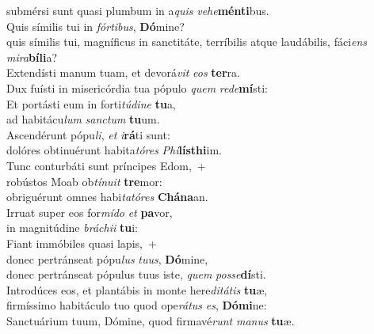 \oddverse submérsi sunt quasi plumbum in a\textit{quis} \textit{ve}\textit{he}\textbf{mén}\textbf{ti}bus.\\
\evenverse Quis símilis tui in \textit{fór}\textit{ti}\textit{bus}, \textbf{Dó}mine?~\*\\
\evenverse quis símilis tui, magníficus in sanctitáte, terríbilis atque laudábilis, fáci\textit{ens} \textit{mi}\textit{ra}\textbf{bí}\textbf{li}a?\\
\oddverse Extendísti manum tuam, et devorá\textit{vit} \textit{e}\textit{os} \textbf{ter}ra.~\*\\
\oddverse Dux fuísti in misericórdia tua pópulo \textit{quem} \textit{re}\textit{de}\textbf{mí}sti:\\
\evenverse Et portásti eum in forti\textit{tú}\textit{di}\textit{ne} \textbf{tu}a,~\*\\
\evenverse ad habitácu\textit{lum} \textit{san}\textit{ctum} \textbf{tu}um.\\
\oddverse Ascendérunt pópu\textit{li}, \textit{et} \textit{i}\textbf{rá}ti sunt:~\*\\
\oddverse dolóres obtinuérunt habita\textit{tó}\textit{res} \textit{Phi}\textbf{lís}\textbf{thi}im.\\
\evenverse Tunc conturbáti sunt príncipes Edom,~+\\
\evenverse  robústos Moab ob\textit{tí}\textit{nu}\textit{it} \textbf{tre}mor:~\*\\
\evenverse obriguérunt omnes habi\textit{ta}\textit{tó}\textit{res} \textbf{Chá}\textbf{na}an.\\
\oddverse Irruat super eos for\textit{mí}\textit{do} \textit{et} \textbf{pa}vor,~\*\\
\oddverse in magnitúdine \textit{brá}\textit{chi}\textit{i} \textbf{tu}i:\\
\evenverse Fiant immóbiles quasi lapis,~+\\
\evenverse  donec pertránseat pópu\textit{lus} \textit{tu}\textit{us}, \textbf{Dó}mine,~\*\\
\evenverse donec pertránseat pópulus tuus iste, \textit{quem} \textit{pos}\textit{se}\textbf{dí}sti.\\
\oddverse Introdúces eos, et plantábis in monte here\textit{di}\textit{tá}\textit{tis} \textbf{tu}æ,~\*\\
\oddverse firmíssimo habitáculo tuo quod ope\textit{rá}\textit{tus} \textit{es}, \textbf{Dó}\textbf{mi}ne:\\
\evenverse Sanctuárium tuum, Dómine, quod firmavé\textit{runt} \textit{ma}\textit{nus} \textbf{tu}æ.~\*\\
